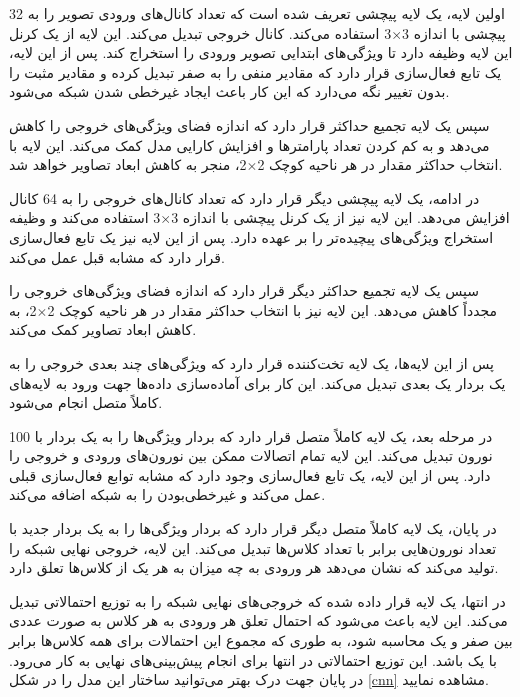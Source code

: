 اولین لایه، یک لایه پیچشی تعریف شده است که تعداد کانال‌های ورودی تصویر را به 32 کانال خروجی تبدیل می‌کند. این لایه از یک کرنل ‎پیچشی با اندازه
3$\times$3
استفاده می‌کند. این لایه وظیفه دارد تا ویژگی‌های ابتدایی تصویر ورودی را استخراج کند. پس از این لایه، یک تابع فعال‌سازی 
قرار دارد که مقادیر منفی را به صفر تبدیل کرده و مقادیر مثبت را بدون تغییر نگه می‌دارد که این کار باعث ایجاد غیرخطی‌ شدن شبکه می‌شود.

سپس یک لایه تجمیع حداکثر%
قرار دارد که اندازه فضای ویژگی‌های خروجی را کاهش می‌دهد و به کم کردن تعداد پارامترها و افزایش کارایی مدل کمک می‌کند. این لایه با انتخاب حداکثر مقدار در هر ناحیه کوچک
2$\times$2،
منجر به کاهش ابعاد تصاویر خواهد شد.

در ادامه، یک لایه پیچشی دیگر قرار دارد که تعداد کانال‌های خروجی را به 64 کانال افزایش می‌دهد. این لایه نیز از یک کرنل پیچشی با اندازه
3$\times$3
استفاده می‌کند و وظیفه استخراج ویژگی‌های پیچیده‌تر را بر عهده دارد. پس از این لایه نیز یک تابع فعال‌سازی
قرار دارد که مشابه قبل عمل می‌کند.

سپس یک لایه تجمیع حداکثر دیگر قرار دارد که اندازه فضای ویژگی‌های خروجی را مجدداً کاهش می‌دهد. این لایه نیز با انتخاب حداکثر مقدار در هر ناحیه کوچک
2$\times$2،
به کاهش ابعاد تصاویر کمک می‌کند.

پس از این لایه‌ها، یک لایه تخت‌کننده قرار دارد که ویژگی‌های چند بعدی خروجی را به یک بردار یک بعدی تبدیل می‌کند. این کار برای آماده‌سازی داده‌ها جهت ورود به لایه‌های کاملاً متصل انجام می‌شود.

در مرحله بعد، یک لایه کاملاً متصل قرار دارد که بردار ویژگی‌ها را به یک بردار با 100 نورون تبدیل می‌کند. این لایه تمام اتصالات ممکن بین نورون‌های ورودی و خروجی را دارد. پس از این لایه، یک تابع فعال‌سازی
وجود دارد که مشابه توابع فعال‌سازی قبلی عمل می‌کند و غیرخطی‌بودن را به شبکه اضافه می‌کند.

در پایان، یک لایه کاملاً متصل دیگر قرار دارد که بردار ویژگی‌ها را به یک بردار جدید با تعداد نورون‌هایی برابر با تعداد کلاس‌ها تبدیل می‌کند. این لایه، خروجی نهایی شبکه را تولید می‌کند که نشان می‌دهد هر ورودی به چه میزان به هر یک از کلاس‌ها تعلق دارد.

در انتها، یک لایه
قرار داده شده که خروجی‌های نهایی شبکه را به توزیع احتمالاتی تبدیل می‌کند. این لایه باعث می‌شود که احتمال تعلق هر ورودی به هر کلاس به صورت عددی بین صفر و یک محاسبه شود، به طوری که مجموع این احتمالات برای همه کلاس‌ها برابر با یک باشد. این توزیع احتمالاتی در انتها برای انجام پیش‌بینی‌های نهایی به کار می‌رود. در پایان جهت درک بهتر می‌توانید ساختار این مدل را در شکل
\ref{cnn}
مشاهده نمایید.


